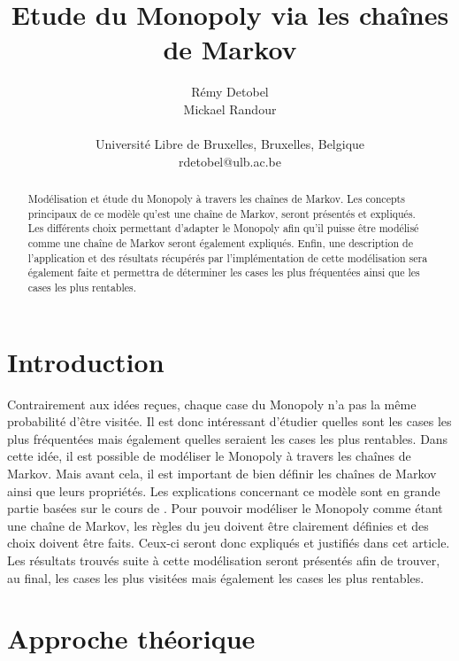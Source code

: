 \documentclass[letterpaper]{article}
\title{Etude du Monopoly via les chaînes de Markov}
\author{Rémy Detobel\\
Mickael Randour\\
\mbox{}\\
Université Libre de Bruxelles, Bruxelles, Belgique \\
rdetobel@ulb.ac.be}
\begin{document}
\maketitle

\begin{abstract}
  Modélisation et étude du Monopoly à travers les chaînes de Markov.
  Les concepts principaux de ce modèle qu'est une chaîne de Markov,
  seront présentés et expliqués.  Les différents choix permettant 
  d'adapter le Monopoly afin qu'il puisse être modélisé comme une chaîne 
  de Markov seront également expliqués.  Enfin, une description de 
  l'application et des résultats récupérés par l'implémentation de cette 
  modélisation sera également faite et permettra de déterminer les cases 
  les plus fréquentées ainsi que les cases les plus rentables.
\end{abstract}

\section{Introduction}
  Contrairement aux idées reçues, chaque case du Monopoly n'a pas la même
  probabilité d'être visitée.  Il est donc intéressant d'étudier quelles sont
  les cases les plus fréquentées mais également quelles seraient les cases
  les plus rentables.  Dans cette idée, il est possible de modéliser
  le Monopoly à travers les chaînes de Markov.  Mais avant cela, il est 
  important de bien définir les chaînes de Markov ainsi que leurs propriétés.
  Les explications concernant ce modèle sont en grande partie basées 
  sur le cours de \citet{COURS}.
  Pour pouvoir modéliser le Monopoly comme étant une chaîne de Markov, 
  les règles du jeu doivent être clairement définies et des choix doivent
  être faits.  Ceux-ci seront donc expliqués et justifiés dans cet article.
  Les résultats trouvés suite à cette modélisation seront présentés afin
  de trouver, au final, les cases les plus visitées mais également les cases
  les plus rentables.
  
  
\section{Approche théorique}
  
\end{document}
